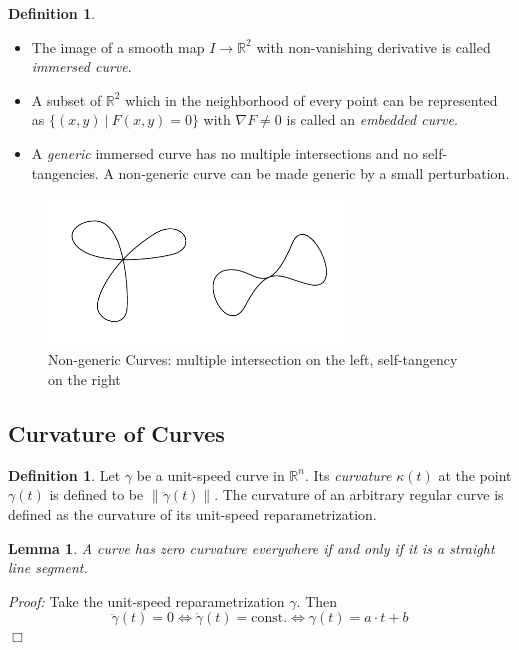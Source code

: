 \documentclass[a4paper,11pt,notitlepage,fullpage]{paper}
\theoremstyle{plain}
\newtheorem{lem}[thm]{Lemma}
\theoremstyle{definition}
\newtheorem{defn}[thm]{Definition} %
\begin{document}
\begin{defn}
\begin{itemize}
\item The image of a smooth map $I \to \mathbb R^2$ with non-vanishing derivative is called \emph{immersed curve}.

\item A subset of $\mathbb R^2$ which in the neighborhood of every point can be represented as $\{(x,y) ~|~ F(x,y) = 0\}$ with $\nabla F \neq 0$ is called an \emph{embedded curve}.

\item A \emph{generic} immersed curve has no multiple intersections and no self-tangencies. A non-generic curve can be made generic by a small perturbation.
\end{itemize}
\end{defn}

\begin{figure}[H]
\centering
\includegraphics[width = 0.7\textwidth]{img/nongeneric}
\caption{Non-generic Curves: multiple intersection on the left, self-tangency on the right}
\label{fig:non-generic}
\end{figure}


\subsection{Curvature of Curves}

\begin{defn}
Let $\gamma$ be a unit-speed curve in $\mathbb R^n$. Its \emph{curvature} $\kappa(t)$ at the point $\gamma(t)$ is  defined to be $\left\| \ddot\gamma(t)\right\|$. The curvature of an arbitrary regular curve is defined as the curvature of  its unit-speed reparametrization.
\end{defn}

\begin{lem}
A curve has zero curvature everywhere if and only if it is a straight line segment.
\end{lem}
\emph{Proof:} Take the unit-speed reparametrization $\gamma$. Then 
\begin{equation*}
\ddot\gamma(t) = 0 \Leftrightarrow \dot\gamma(t) = \text{const.} \Leftrightarrow \gamma(t) = a\cdot t+b
\end{equation*}
\hfill $\Box$
\end{document}
